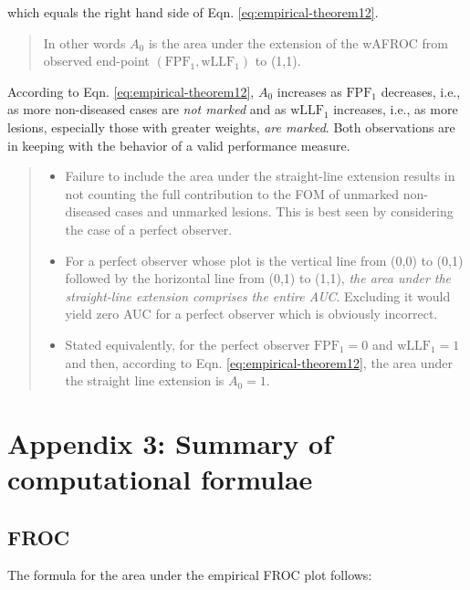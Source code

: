 \documentclass[
]{book}
\providecommand{\tightlist}{%
  \setlength{\itemsep}{0pt}\setlength{\parskip}{0pt}}
\begin{document}
which equals the right hand side of Eqn. \eqref{eq:empirical-theorem12}.

\begin{quote}
In other words \(A_0\) is the area under the extension of the wAFROC from observed end-point \(\left ( \text{FPF}_1, \text{wLLF}_1 \right )\) to (1,1).
\end{quote}

According to Eqn. \eqref{eq:empirical-theorem12}, \(A_0\) increases as \(\text{FPF}_1\) decreases, i.e., as more non-diseased cases are \emph{not marked} and as \(\text{wLLF}_1\) increases, i.e., as more lesions, especially those with greater weights, \emph{are marked}. Both observations are in keeping with the behavior of a valid performance measure.

\begin{quote}
\begin{itemize}
\tightlist
\item
  Failure to include the area under the straight-line extension results in not counting the full contribution to the FOM of unmarked non-diseased cases and unmarked lesions. This is best seen by considering the case of a perfect observer.
\item
  For a perfect observer whose plot is the vertical line from (0,0) to (0,1) followed by the horizontal line from (0,1) to (1,1), \emph{the area under the straight-line extension comprises the entire AUC}. Excluding it would yield zero AUC for a perfect observer which is obviously incorrect.
\item
  Stated equivalently, for the perfect observer \(\text{FPF}_1 = 0\) and \(\text{wLLF}_1 = 1\) and then, according to Eqn. \eqref{eq:empirical-theorem12}, the area under the straight line extension is \(A_0 = 1\).
\end{itemize}
\end{quote}

\hypertarget{empirical-summary-computational-formulae}{%
\section{Appendix 3: Summary of computational formulae}\label{empirical-summary-computational-formulae}}

\hypertarget{froc}{%
\subsection{FROC}\label{froc}}

The formula for the area under the empirical FROC plot follows:
\end{document}
